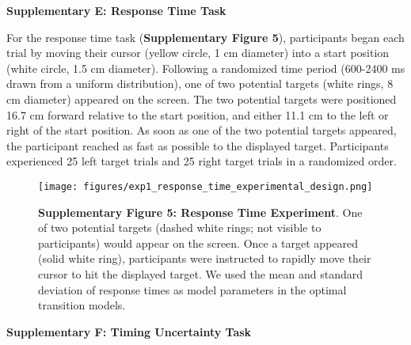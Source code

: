 \documentclass[12pt]{article}
\newcommand\boldblue[1]{\textcolor{mydarkblue}{\textbf{#1}}}
\begin{document}
\newpage
\noindent\boldblue{\large\textcolor{mydarkblue}{Supplementary E: Response Time Task}}

\noindent For the response time task (\boldblue{Supplementary Figure 5}), participants began each trial by moving their cursor (yellow circle, 1 cm diameter) into a start position (white circle, 1.5 cm diameter). Following a randomized time period (600-2400 ms drawn from a uniform distribution), one of two potential targets (white rings, 8 cm diameter) appeared on the screen. The two potential targets were positioned 16.7 cm forward relative to the start position, and either 11.1 cm to the left or right of the start position. As soon as one of the two potential targets appeared, the participant reached as fast as possible to the displayed target. Participants experienced 25 left target trials and 25 right target trials in a randomized order. 
\begin{figure}[H]
    \centering
    \texttt{[image: figures/exp1\_response\_time\_experimental\_design.png]}

    \caption*{\boldblue{Supplementary Figure 5: Response Time Experiment}. One of two potential targets (dashed white rings; not visible to participants) would appear on the screen. Once a target appeared (solid white ring), participants were instructed to rapidly move their cursor to hit the displayed target. We used the mean and standard deviation of response times as model parameters in the optimal transition models.}
\end{figure}

\newpage
\noindent\boldblue{\large\textcolor{mydarkblue}{Supplementary F: Timing Uncertainty Task}}
\end{document}
